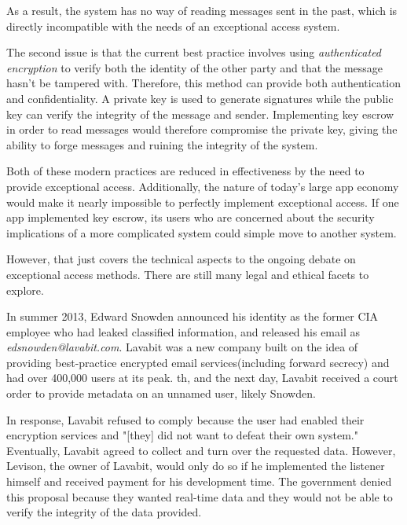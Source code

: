 \documentclass[12pt]{turabian-researchpaper}
\begin{document}
As a result, the system has no way of reading messages sent in the past, which is directly incompatible with the needs of an exceptional access system.

The second issue is that the current best practice involves using \textit{authenticated encryption} to verify both the identity of the other party and that the message hasn't be tampered with.
Therefore, this method can provide both authentication and confidentiality.
A private key is used to generate signatures while the public key can verify the integrity of the message and sender.
Implementing key escrow in order to read messages would therefore compromise the private key, giving the ability to forge messages and ruining the integrity of the system.

Both of these modern practices are reduced in effectiveness by the need to provide exceptional access.
Additionally, the nature of today's large app economy would make it nearly impossible to perfectly implement exceptional access.
If one app implemented key escrow, its users who are concerned about the security implications of a more complicated system could simple move to another system.

However, that just covers the technical aspects to the ongoing debate on exceptional access methods.
There are still many legal and ethical facets to explore.

In summer 2013, Edward Snowden announced his identity as the former CIA employee who had leaked classified information,
and released his email as \textit{edsnowden@lavabit.com}.
Lavabit was a new company built on the idea of providing best-practice encrypted email services(including forward secrecy) and had over 400,000 users at its peak.
th, and the next day, Lavabit received a court order to provide metadata on an unnamed user, likely Snowden.

In response, Lavabit refused to comply because the user had enabled their encryption services and "[they] did not want to defeat their own system."
Eventually, Lavabit agreed to collect and turn over the requested data.
However, Levison, the owner of Lavabit, would only do so if he implemented the listener himself and received payment for his development time.
The government denied this proposal because they wanted real-time data and they would not be able to verify the integrity of the data provided.
\end{document}
